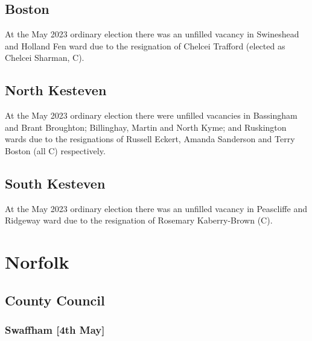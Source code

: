 \documentclass[a4paper,openany]{book}
\begin{document}
\begin{resultsiii}
\subsection*{Boston}

At the May 2023 ordinary election there was an unfilled vacancy in Swineshead and Holland Fen ward due to the resignation of Chelcei Trafford (elected as Chelcei Sharman, C).%

\subsection*{North Kesteven}

At the May 2023 ordinary election there were unfilled vacancies in Bassingham and Brant Broughton; Billinghay, Martin and North Kyme; and Ruskington wards due to the resignations of Russell Eckert, Amanda Sanderson and Terry Boston (all C) respectively.%
%
%

\subsection*{South Kesteven}

At the May 2023 ordinary election there was an unfilled vacancy in Peascliffe and Ridgeway ward due to the resignation of Rosemary Kaberry-Brown (C).%

\section{Norfolk}

\subsection*{County Council}

\subsubsection*{Swaffham \hspace*{\fill}\nolinebreak[1]%
	\enspace\hspace*{\fill}
	[4th May]}


\end{resultsiii}
\end{document}
